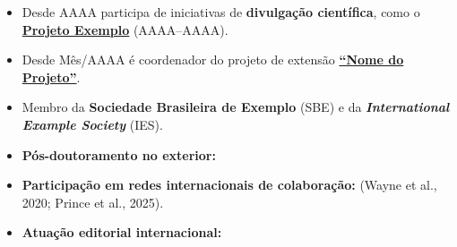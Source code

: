 % 
% 


\vspace{1em}
\begin{itemize}
    \item Desde AAAA participa de iniciativas de \textbf{divulgação científica}, como o \href{https://exemplo.org}{\textbf{Projeto Exemplo}} (AAAA--AAAA). \lipsum[1][1-3]
    
    \item Desde Mês/AAAA é coordenador do projeto de extensão \href{https://exemplo.org}{\textbf{``Nome do Projeto''}}. \lipsum[2][1-3]

    \item Membro da \textbf{Sociedade Brasileira de Exemplo} (SBE) e da \textbf{\emph{International Example Society}} (IES).
\end{itemize}

\vspace{1em}


\vspace{1em}

\begin{itemize}
    \item \textbf{Pós-doutoramento no exterior:} \lipsum[3][1-3]
    
    \item \textbf{Participação em redes internacionais de colaboração:} \lipsum[4][1-4] (Wayne et al., 2020; Prince et al., 2025).
    
    \item \textbf{Atuação editorial internacional:} \lipsum[5][1-3]

\end{itemize}


